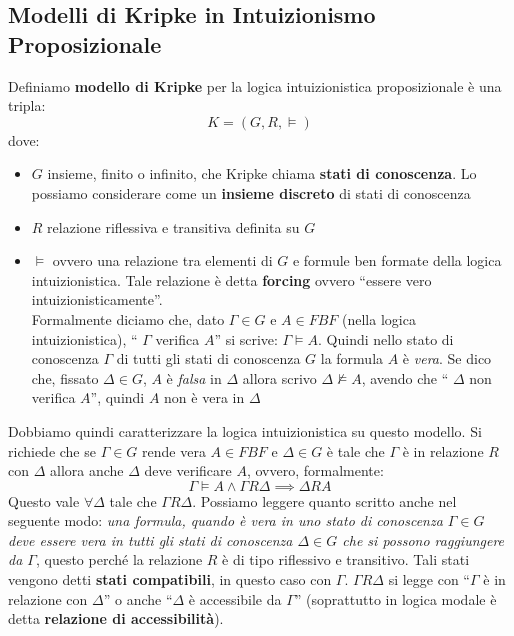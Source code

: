 \documentclass[a4paper,12pt, oneside]{book}
\begin{document}
\subsection{Modelli di Kripke in Intuizionismo Proposizionale}
\begin{definizione}
  Definiamo \textbf{modello di Kripke} per la logica intuizionistica
  proposizionale è una tripla:
  \[K=(G, R, \vDash)\]
  dove:
  \begin{itemize}
    \item $G$ insieme, finito o infinito, che Kripke chiama \textbf{stati di
      conoscenza}. Lo possiamo considerare come un \textbf{insieme discreto} di
    stati di conoscenza 
    \item $R$ relazione riflessiva e transitiva definita su $G$
    \item $\vDash$ ovvero una relazione tra elementi di $G$ e formule ben
    formate della logica intuizionistica. Tale relazione è detta
    \textbf{forcing} ovvero ``essere vero intuizionisticamente''.\\
    Formalmente diciamo che, dato $\Gamma\in G$ e $A\in FBF$ (nella logica
    intuizionistica), ``$\,\,\Gamma$ verifica $A$'' si scrive: $\Gamma\vDash
    A$. Quindi nello stato di conoscenza $\Gamma$ di tutti gli stati di
    conoscenza $G$ la formula $A$ è \emph{vera}. Se dico che, fissato $\Delta\in
    G$, $A$ è \emph{falsa} in $\Delta$ allora scrivo $\Delta\nvDash A$, avendo
    che ``$\,\,\Delta$ non verifica $A$'', quindi $A$ non è vera in $\Delta$
  \end{itemize}
\end{definizione}
Dobbiamo quindi caratterizzare la logica intuizionistica su questo modello. Si
richiede che se $\Gamma\in G$ rende vera $A\in FBF$ e $\Delta\in G$ è tale che
$\Gamma$ è in relazione $R$ con $\Delta$ allora anche $\Delta$ deve verificare
$A$, ovvero, formalmente:
\[\Gamma\vDash A \land \Gamma R\Delta\implies \Delta R A\]
Questo vale $\forall \Delta$ tale che $\Gamma R \Delta$.
Possiamo leggere quanto scritto anche nel seguente modo: \textit{una formula,
  quando è vera in uno stato di conoscenza $\Gamma\in G$ deve essere vera in
  tutti gli stati di conoscenza $\Delta\in G$ che si possono raggiungere da
  $\Gamma$}, questo perché la relazione $R$ è di tipo riflessivo e
transitivo. Tali stati vengono detti \textbf{stati compatibili}, in questo caso
con $\Gamma$. $\Gamma R \Delta$ si legge con ``$\Gamma$ è in relazione con
$\Delta$'' o anche  ``$\Delta$ è accessibile da $\Gamma$'' (soprattutto in
logica modale è detta \textbf{relazione di accessibilità}).\\
\end{document}
